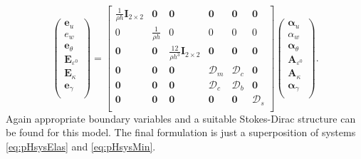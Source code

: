 \begin{equation}
\begin{pmatrix}
\bm{e}_u \\
e_w \\
\bm{e}_{\theta} \\
\bm{E}_{\varepsilon^0} \\
\bm{E}_{\kappa} \\
\bm{e}_{\gamma} \\
\end{pmatrix}
 = 
\begin{bmatrix}
\frac{1}{\rho h}\bm{I}_{2 \times 2} & \bm{0} & \bm{0} &  \bm{0} & \bm{0} & \bm{0} \\
0 & \frac{1}{\rho h} & 0 & 0  & 0 & 0 \\
\bm{0} & \bm{0} & \frac{12}{\rho h^3}\bm{I}_{2 \times 2} & \bm{0} & \bm{0} & \bm{0}\\
\bm{0} & \bm{0} & \bm{0} & \bm{\mathcal{D}}_m & \bm{\mathcal{D}}_c & \bm{0} \\
\bm{0} & \bm{0} & \bm{0} & \bm{\mathcal{D}}_c & \bm{\mathcal{D}}_b & \bm{0}\\
\bm{0} & \bm{0} & \bm{0} & \bm{0} & \bm{0} & \bm{\mathcal{D}}_s \\
\end{bmatrix}
\begin{pmatrix}
\bm\alpha_u \\
\alpha_w \\
\bm\alpha_\theta \\
\bm{A}_{\varepsilon^0} \\
\bm{A}_\kappa \\
\bm\alpha_{\gamma} \\
\end{pmatrix}.
\end{equation}
Again appropriate boundary variables and a suitable Stokes-Dirac structure can be found for this model. The final formulation is just a superposition of systems \eqref{eq:pHsysElas} and \eqref{eq:pHsysMin}.

